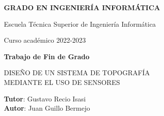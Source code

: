\thispagestyle{empty}
\vspace{2cm}

\begin{figure}[htb]
  \centerline{}
\end{figure}

\begin{center}
  {\Large {\bf GRADO EN INGENIERÍA INFORMÁTICA}}
  \vspace{5mm}
 
  {\large {Escuela Técnica Superior de Ingeniería Informática}}
  \vspace{5mm}

  {\large {Curso académico 2022-2023}}

  \vspace{1cm}

  {\large {\bf Trabajo de Fin de Grado}}

  \vspace{2cm}

  {\Large {DISEÑO DE UN SISTEMA DE TOPOGRAFÍA \\
  MEDIANTE EL USO DE SENSORES\\[1cm] }}

  \vspace{5cm}
  {\bf Tutor}: Gustavo Recio Isasi \\
  {\bf Autor}: Juan Guillo Bermejo
\end{center}

\clearpage
\thispagestyle{empty}
